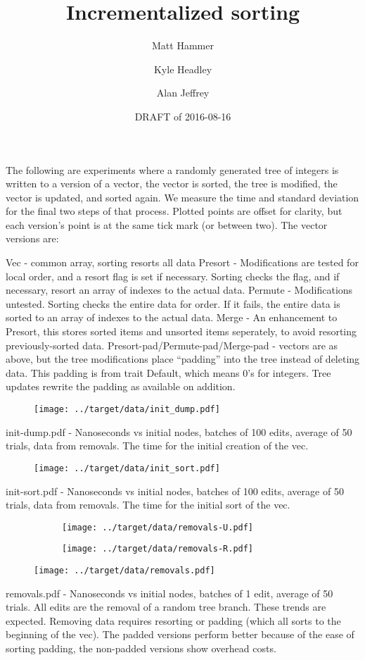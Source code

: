 \documentclass{article}
\title{Incrementalized sorting}
\author{Matt Hammer\and Kyle Headley\and Alan Jeffrey}
\date{DRAFT of 2016-08-16}
\begin{document}
\maketitle

The following are experiments where a randomly generated tree of integers is written to a version of a vector, the vector is sorted, the tree is modified, the vector is updated, and sorted again. We measure the time and standard deviation for the final two steps of that process. Plotted points are offset for clarity, but each version's point is at the same tick mark (or between two). The vector versions are:

Vec - common array, sorting resorts all data
Presort - Modifications are tested for local order, and a resort flag is set if necessary. Sorting checks the flag, and if necessary, resort an array of indexes to the actual data.
Permute - Modifications untested. Sorting checks the entire data for order. If it fails, the entire data is sorted to an array of indexes to the actual data.
Merge - An enhancement to Presort, this stores sorted items and unsorted items seperately, to avoid resorting previously-sorted data.
Presort-pad/Permute-pad/Merge-pad - vectors are as above, but the tree modifications place ``padding'' into the tree instead of deleting data. This padding is from trait Default, which means 0's for integers. Tree updates rewrite the padding as available on addition.

\begin{figure}[H]
  \centering
  \texttt{[image: ../target/data/init\_dump.pdf]}
\end{figure}
init-dump.pdf - Nanoseconds vs initial nodes, batches of 100 edits, average of 50 trials, data from removals. The time for the initial creation of the vec. 

\begin{figure}[H]
  \centering
  \texttt{[image: ../target/data/init\_sort.pdf]}
\end{figure}
init-sort.pdf - Nanoseconds vs initial nodes, batches of 100 edits, average of 50 trials, data from removals. The time for the initial sort of the vec. 

\begin{figure}[H]
  \centering
  \begin{subfigure}{.5\textwidth}
    \texttt{[image: ../target/data/removals-U.pdf]}
  \end{subfigure}%
  \begin{subfigure}{.5\textwidth}
    \texttt{[image: ../target/data/removals-R.pdf]}
  \end{subfigure}
  \texttt{[image: ../target/data/removals.pdf]}
\end{figure}
removals.pdf - Nanoseconds vs initial nodes, batches of 1 edit, average of 50 trials. All edits are the removal of a random tree branch. These trends are expected. Removing data requires resorting or padding (which all sorts to the beginning of the vec). The padded versions perform better because of the ease of sorting padding, the non-padded versions show overhead costs.
\end{document}
